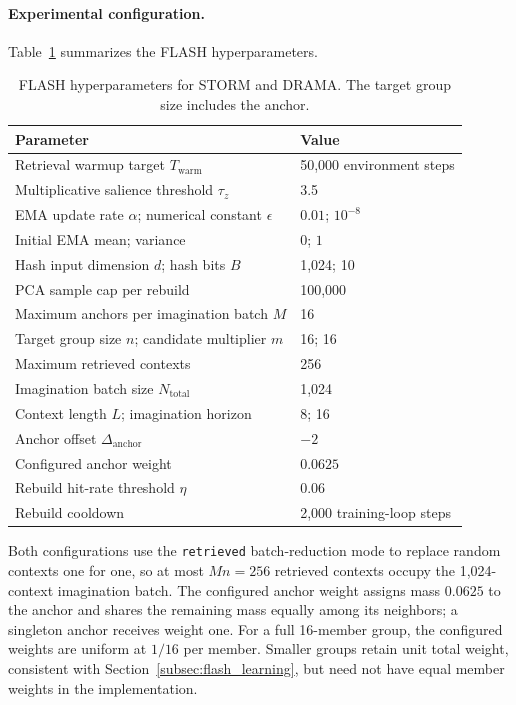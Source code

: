 \documentclass{article} %
\begin{document}
\paragraph{Experimental configuration.}
Table~\ref{tab:flash_defaults} summarizes the FLASH hyperparameters.

\begin{table}[!htbp]
\centering
\small
\caption{FLASH hyperparameters for STORM and DRAMA. The target group size includes the anchor.}
\label{tab:flash_defaults}
\setlength{\tabcolsep}{5pt}
\renewcommand{\arraystretch}{1.1}
\begin{tabular*}{\textwidth}{@{\extracolsep{\fill}}ll@{}}
\toprule
Parameter & Value \\
\midrule
Retrieval warmup target $T_{\text{warm}}$ & 50,000 environment steps \\
Multiplicative salience threshold $\tau_z$ & 3.5 \\
EMA update rate $\alpha$; numerical constant $\epsilon$ & $0.01$; $10^{-8}$ \\
Initial EMA mean; variance & $0$; $1$ \\
Hash input dimension $d$; hash bits $B$ & 1,024; 10 \\
PCA sample cap per rebuild & 100,000 \\
Maximum anchors per imagination batch $M$ & 16 \\
Target group size $n$; candidate multiplier $m$ & 16; 16 \\
Maximum retrieved contexts & 256 \\
Imagination batch size $N_{\text{total}}$ & 1,024 \\
Context length $L$; imagination horizon & 8; 16 \\
Anchor offset $\Delta_{\text{anchor}}$ & $-2$ \\
Configured anchor weight & $0.0625$ \\
Rebuild hit-rate threshold $\eta$ & $0.06$ \\
Rebuild cooldown & 2,000 training-loop steps \\
\bottomrule
\end{tabular*}
\end{table}

Both configurations use the \texttt{retrieved} batch-reduction mode to replace random contexts one for one, so at most $Mn=256$ retrieved contexts occupy the 1,024-context imagination batch. The configured anchor weight assigns mass $0.0625$ to the anchor and shares the remaining mass equally among its neighbors; a singleton anchor receives weight one. For a full 16-member group, the configured weights are uniform at $1/16$ per member. Smaller groups retain unit total weight, consistent with Section~\ref{subsec:flash_learning}, but need not have equal member weights in the implementation.
\end{document}
